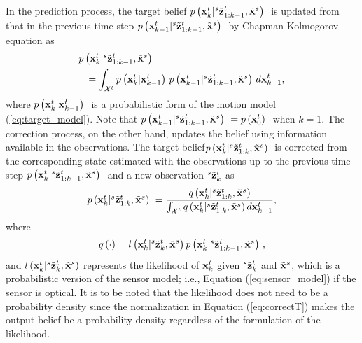In the prediction process, the target belief \linebreak[4]$\mbox{$ {p} \left ( \mathbf{x}_{k}^{t}|{}^{s}\tilde {\mathbf{z}}_{1:k-1}^{t},\tilde {\mathbf{x}}^{s} \right )$ }$ is updated from that in the previous time step $\mbox{$ {p} \left ( \mathbf{x}_{k-1}^{t}|{}^{s}\tilde {\mathbf{z}}_{1:k-1}^{t},\tilde {\mathbf{x}}^{s} \right )$ }$ by Chapman-Kolmogorov equation as
\begin{eqnarray}\label{eq:predictT}
\lefteqn{\p{\Vxbp{k}{t}|\ptVzbp{s}{1:k-1}{t},\tVxp{s}}} \nonumber\\
&&= \int_{\Cal{X}^t} \p{\Vxbp{k}{t}|\Vxbp{k-1}{t}} \p{\Vxbp{k-1}{t}|\ptVzbp{s}{1:k-1}{t},\tVxp{s}} d\Vxbp{k-1}{t},\nonumber\\
\end{eqnarray}
where $\mbox{$ {p} \left ( \mathbf{x}_{k}^{t}|\mathbf{x}_{k-1}^{t} \right )$ }$ is a probabilistic form of the motion model (\ref{eq:target_model}).  Note that $\mbox{$ {p} \left ( \mathbf{x}_{k-1}^{t}|{}^{s}\tilde {\mathbf{z}}_{1:k-1}^{t},\tilde {\mathbf{x}}^{s} \right )$ } = \mbox{$ {p} \left ( \mathbf{x}_{0}^{t} \right )$ }$ when $k=1$.
The correction process, on the other hand, updates the belief using information available in the observations.  The target belief\linebreak[4] $\mbox{$ {p} \left ( \mathbf{x}_{k}^{t}|{}^{s}\tilde {\mathbf{z}}_{1:k}^{t},\tilde {\mathbf{x}}^{s} \right )$ }$ is corrected from the corresponding state estimated with the observations up to the previous time step $\mbox{$ {p} \left ( \mathbf{x}_{k}^{t}|{}^{s}\tilde {\mathbf{z}}_{1:k-1}^{t},\tilde {\mathbf{x}}^{s} \right )$ }$ and a new observation ${}^{s}\tilde {\mathbf{z}}_{k}^{t}$ as
\begin{eqnarray}\label{eq:correctT}
\mbox{$ {p} \left ( \mathbf{x}_{k}^{t}|{}^{s}\tilde {\mathbf{z}}_{1:k}^{t},\tilde {\mathbf{x}}^{s} \right )$ } = \frac{q \left ( \mathbf{x}_{k}^{t}|{}^{s}\tilde {\mathbf{z}}_{1:k}^{t},\tilde {\mathbf{x}}^{s} \right )} {\int_{\mathcal{X}^t}
q \left ( \mathbf{x}_{k}^{t}|{}^{s}\tilde {\mathbf{z}}_{1:k}^{t},\tilde {\mathbf{x}}^{s} \right ) d\mathbf{x}_{k-1}^{t}},
\end{eqnarray}
where 
\begin{eqnarray}\label{eq:qT}
q \left ( \cdot \right ) = {l \left ( \mathbf{x}_{k}^{t}|{}^{s}\tilde {\mathbf{z}}_{k}^{t},\tilde {\mathbf{x}}^{s} \right ) \mbox{$ {p} \left ( \mathbf{x}_{k}^{t}|{}^{s}\tilde {\mathbf{z}}_{1:k-1}^{t},\tilde {\mathbf{x}}^{s} \right )$ }}, 
\end{eqnarray}
and $l \left ( \mathbf{x}_{k}^{t}|{}^{s}\tilde {\mathbf{z}}_{k}^{t},\tilde {\mathbf{x}}^{s} \right )$ represents the likelihood of $\mathbf{x}_{k}^{t}$ given ${}^{s}\tilde {\mathbf{z}}_{k}^{t}$ and $\tilde {\mathbf{x}}^{s}$, which is a probabilistic version of the sensor model; i.e., Equation (\ref{eq:sensor_model}) if the sensor is optical.  It is to be noted that the likelihood does not need to be a probability density since the normalization in Equation (\ref{eq:correctT}) makes the output belief be a probability density regardless of the formulation of the likelihood.  


